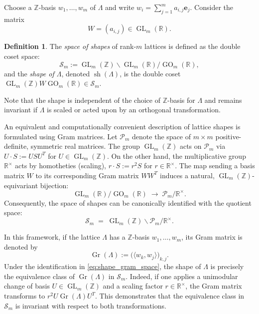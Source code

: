 \documentclass{amsart}
\theoremstyle{plain}
\theoremstyle{definition}
\newtheorem{definition}[theorem]{Definition}
\theoremstyle{remark}
\numberwithin{equation}{section}
\begin{document}
\par Choose a $\mathbb{Z}$-basis $ w_1, \dots, w_m$ of $\Lambda$ and write $ w_i=\sum_{j=1}^m a_{i,j} \mathbf e_j$. Consider the matrix \[W =(a_{i,j})\in \operatorname{GL}_m(\mathbb{R}).\] 
\begin{definition}The \emph{space of shapes} of rank-$m$ lattices is defined as the double coset space:
\[
    \mathcal{S}_m := \operatorname{GL}_m(\mathbb{Z}) \backslash \operatorname{GL}_m(\mathbb{R}) / \operatorname{GO}_m(\mathbb{R}),
\]
and the \emph{shape of $\Lambda$}, denoted $\operatorname{sh}(\Lambda)$, is the double coset $\operatorname{GL}_m(\mathbb{Z}) W \operatorname{GO}_m(\mathbb{R}) \in \mathcal{S}_m$. 
\end{definition}
\noindent Note that the shape is independent of the choice of $\mathbb{Z}$-basis for $\Lambda$ and remains invariant if $\Lambda$ is scaled or acted upon by an orthogonal transformation. 
\par An equivalent and computationally convenient description of lattice shapes is formulated using Gram matrices. Let $\mathcal{P}_m$ denote the space of $m \times m$ positive-definite, symmetric real matrices. The group $\operatorname{GL}_m(\mathbb{Z})$ acts on $\mathcal{P}_m$ via $U \cdot S := U S U^T$ for $U \in \operatorname{GL}_m(\mathbb{Z})$. On the other hand, the multiplicative group $\mathbb{R}^\times$ acts by homotheties (scaling), $r \cdot S := r^2 S$ for $r \in \mathbb{R}^\times$. The map sending a basis matrix $W$ to its corresponding Gram matrix $W W^T$ induces a natural, $\operatorname{GL}_m(\mathbb{Z})$-equivariant bijection:
\[
    \operatorname{GL}_m(\mathbb{R}) / \operatorname{GO}_m(\mathbb{R}) \;\longrightarrow\; \mathcal{P}_m / \mathbb{R}^\times.
\]
Consequently, the space of shapes can be canonically identified with the quotient space:
\begin{equation} \label{eq:shape_gram_space}
    \mathcal{S}_m \;=\; \operatorname{GL}_m(\mathbb{Z}) \backslash \mathcal{P}_m / \mathbb{R}^\times.
\end{equation}

In this framework, if the lattice $\Lambda$ has a $\mathbb{Z}$-basis $w_1, \dots, w_m$, its Gram matrix is denoted by \[\operatorname{Gr}(\Lambda) := \bigl( \langle w_k, w_j \rangle \bigr)_{k,j}.\] Under the identification in \eqref{eq:shape_gram_space}, the shape of $\Lambda$ is precisely the equivalence class of $\operatorname{Gr}(\Lambda)$ in $\mathcal{S}_m$. Indeed, if one applies a unimodular change of basis $U \in \operatorname{GL}_m(\mathbb{Z})$ and a scaling factor $r \in \mathbb{R}^\times$, the Gram matrix transforms to $r^2 U \operatorname{Gr}(\Lambda) U^T$. This demonstrates that the equivalence class in $\mathcal{S}_m$ is invariant with respect to both transformations.
\end{document}
